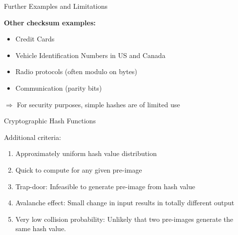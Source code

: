 \documentclass[handout]{beamer}
\begin{document}
\begin{frame}{Further Examples and Limitations}

\textbf{Other checksum examples:}
	\begin{itemize}
		\item Credit Cards
		\item Vehicle Identification Numbers in US and Canada
		\item Radio protocols (often modulo on bytes)
		\item Communication (parity bits)
	\end{itemize}

\vspace{1em}


$\Rightarrow$ For security purposes, simple hashes are of limited use
	
\end{frame}

\begin{frame}{Cryptographic Hash Functions}

Additional criteria:
	\begin{enumerate}
		\item Approximately uniform hash value distribution
		\item Quick to compute for any given pre-image
		\item Trap-door: Infeasible to generate pre-image from hash value
		\item Avalanche effect: Small change in input results in totally different output
		\item Very low collision probability: Unlikely that two pre-images generate the same hash value.
	\end{enumerate}
	\vspace{1em}

	
\end{frame}
\end{document}

